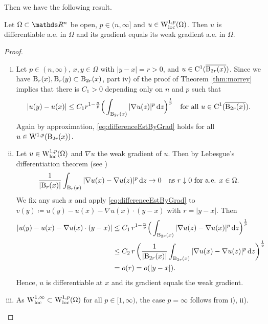 Then we have the following result.

\begin{prop}
Let $\Omega \subset \R^n$ be open, $p \in (n,\infty]$ and $u \in \mathrm{W}_{\operatorname{loc}}^{1,p}(\Omega)$.
Then $u$ is differentiable a.e. in $\Omega$ and its gradient equals its weak gradient a.e. in $\Omega$.
\end{prop}

\begin{proof}
  \begin{enumerate}[i)]
    \item Let $p \in (n,\infty)$, $x,y \in \Omega$ with $|y - x| = r > 0$, and $u \in \mathrm{C}^1(\overline{\mathrm{B}_{2r}(x)})$.
      Since we have $\mathrm{B}_r(x), \mathrm{B}_r(y) \subset \mathrm{B}_{2r}(x)$, part iv) of the proof of Theorem \ref{thm:morrey} implies that there is $C_1 > 0$ depending only on $n$ and $p$ such that
      \begin{equation}
        \label{eq:differenceEstByGrad}
        |u(y) - u(x)|
        \leq C_1 r^{1 - \frac{n}{p}} \Big( \int_{\mathrm{B}_{2r}(x)} |\nabla u(z) |^p \, {\operatorname{d}\!{z}} \Big)^{\frac{1}{p}} \quad\text{for all } u \in \mathrm{C}^1(\overline{\mathrm{B}_{2r}(x)}).
      \end{equation}
      Again by approximation, \eqref{eq:differenceEstByGrad} holds for all $u \in \mathrm{W}^{1,p}(\mathrm{B}_{2r}(x))$.

    \item Let $u \in \mathrm{W}_{\operatorname{loc}}^{1,p}(\Omega)$ and $\nabla u$ the weak gradient of $u$.
      Then by Lebesgue's differentiation theorem (see \cite[Section E.4]{evans2010partial})
      $$
      \frac{1}{|\mathrm{B}_r(x)|} \int_{\mathrm{B}_r(x)} |\nabla u(x) - \nabla u(z)|^p \, {\operatorname{d}\!{z}} \to 0 \quad \text{as } r \downarrow 0 \text{ for a.e. } x \in \Omega.
      $$
      We fix any such $x$ and apply \eqref{eq:differenceEstByGrad} to 
      $v(y) \coloneqq u(y) - u(x) - \nabla u(x) \cdot(y - x)$ with $r = |y - x|$.
      Then
      \begin{align*}
        |u(y) - u(x) - \nabla u(x) \cdot (y - x)|
        &\leq C_1 \, r^{1 - \frac{n}{p}} \Big(\int_{\mathrm{B}_{2r}(x)} |\nabla u(z) - \nabla u(x)|^p \, {\operatorname{d}\!{z}} \Big)^{\frac{1}{p}} \\
        &\leq C_2 \, r\, \bigg( \frac{1}{|\mathrm{B}_{2r}(x)|} \int_{\mathrm{B}_{2r}(x)} |\nabla u(x) - \nabla u(z)|^p \, {\operatorname{d}\!{z}} \bigg)^{\frac{1}{p}} \\
        &= o(r) = o(|y - x|).
      \end{align*}
      Hence, $u$ is differentiable at $x$ and its gradient equals the weak gradient.

    \item As $\mathrm{W}_{\operatorname{loc}}^{1,\infty} \subset \mathrm{W}_{\operatorname{loc}}^{1,p}(\Omega)$ for all $p \in [1,\infty)$, the case $p = \infty$ follows from i), ii). \qedhere
  \end{enumerate}
\end{proof}

